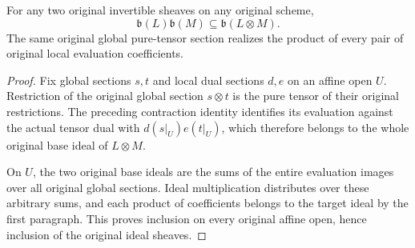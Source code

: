 \begin{proposition}
\label{prop:actual-invertible-base-ideal-multiplication}
For any two original invertible sheaves on any original scheme,
\[
 \mathfrak b(L)\mathfrak b(M)\subseteq\mathfrak b(L\otimes M).
\]
The same original global pure-tensor section realizes the product of
every pair of original local evaluation coefficients.
\leanok
\end{proposition}
\begin{proof}
Fix global sections $s,t$ and local dual sections $d,e$ on an affine
open $U$. Restriction of the original global section $s\otimes t$
is the pure tensor of their original restrictions. The preceding
contraction identity identifies its evaluation against the actual
tensor dual with $d(s|_U)e(t|_U)$, which therefore belongs to the
whole original base ideal of $L\otimes M$.

On $U$, the two original base ideals are the sums of the entire
evaluation images over all original global sections. Ideal
multiplication distributes over these arbitrary sums, and each
product of coefficients belongs to the target ideal by the first
paragraph. This proves inclusion on every original affine open,
hence inclusion of the original ideal sheaves.
\end{proof}
